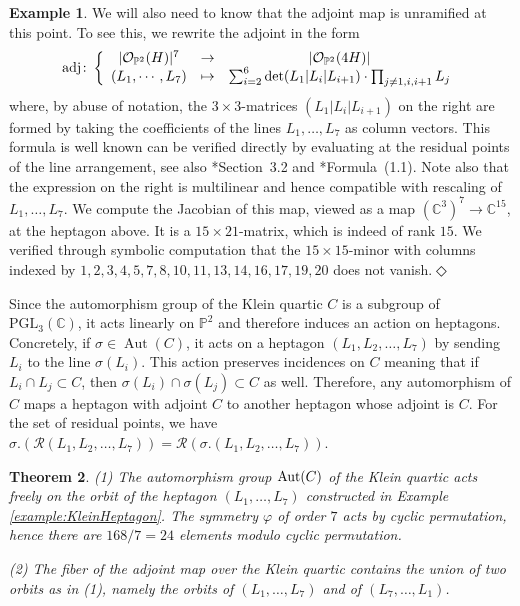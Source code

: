 \documentclass[12pt]{article}
\newtheorem{theorem}{Theorem}[section]
\numberwithin{equation}{section}
\theoremstyle{definition}
\newtheorem{example}[theorem]{Example}
\renewcommand{\P}{\mathbb{P}}
\newcommand{\C}{\mathbb{C}}
\newcommand{\sO}{\mathcal{O}}
\begin{document}
\begin{example}
	We will also need to know that the adjoint map is unramified at this point. To see this, we rewrite the adjoint in the form
	\[
	   	{\rm adj}\colon \left\{\begin{array}{ccc}
			|\sO_{\P^2}(H)|^7 & \to & |\sO_{\P^2}(4H)|\\
			(L_1,\cdots,L_7) & \mapsto & \sum_{i=2}^6 \det(L_1|L_i|L_{i+1})\cdot\prod_{j\neq 1,i,i+1} L_j
		\end{array}\right.
	\]
	where, by abuse of notation, the $3\times 3$-matrices $(L_1|L_i|L_{i+1})$ on the right are formed by taking the coefficients of the lines $L_1,\dots,L_7$ as column vectors. This formula is well known can be verified directly by evaluating at the residual points of the line arrangement, see also \cite{zbMATH00989549}*{Section~3.2} and \cite{KRzbMATH07286075}*{Formula~(1.1)}. Note also that the expression on the right is multilinear and hence compatible with rescaling of $L_1,\dots,L_7$.
	We compute the Jacobian of this map, viewed as a map $(\C^3)^7\to\C^{15}$, at the heptagon above. It is a $15\times 21$-matrix, which is indeed of rank $15$. We verified through symbolic computation that the $15\times 15$-minor with columns indexed by $1, 2, 3, 4, 5, 7, 8, 10, 11, 13, 14, 16, 17, 19, 20$ does not vanish.\hfill$\Diamond$
\end{example}

Since the automorphism group of the Klein quartic $C$ is a subgroup of $\mathrm{PGL}_3(\C)$, it acts linearly on $\P^2$ and therefore induces an action on heptagons. Concretely, if $\sigma \in \operatorname{Aut}(C)$, it acts on a heptagon $(L_1,L_2,\ldots,L_7)$ by sending $L_i$ to the line $\sigma(L_i)$. This action preserves incidences on $C$ meaning that if $L_i\cap L_j\subset C$, then $\sigma(L_i)\cap \sigma(L_j)\subset C$ as well. Therefore, any automorphism of $C$ maps a heptagon with adjoint $C$ to another heptagon whose adjoint is $C$. For the set of residual points, we have $\sigma.(\mathcal{R}(L_1,L_2,\ldots,L_7)) = \mathcal{R}(\sigma.(L_1,L_2,\ldots,L_7))$. 

\begin{theorem}
	(1) The automorphism group ${\rm Aut}(C)$ of the Klein quartic acts freely on the orbit of the heptagon $(L_1,\dots,L_7)$ constructed in Example \ref{example:KleinHeptagon}. The symmetry $\varphi$ of order $7$ acts by cyclic permutation, hence there are $168/7=24$ elements modulo cyclic permutation. 

	(2) The fiber of the adjoint map over the Klein quartic contains the union of two orbits as in (1), namely the orbits of $(L_1,\dots,L_7)$ and of $(L_7,\dots,L_1)$.
\end{theorem}
\end{document}
